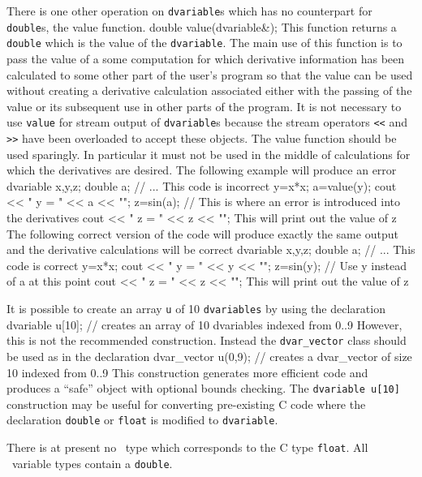 \documentclass[12pt]{book}
\begin{document}
There is one other operation on {\tt dvariable}s which has no counterpart
for {\tt double}s, the  value function. 
\beginexamplea
double value(dvariable&);
\endexample
\noindent This function returns a {\tt double} which is the value of 
the {\tt dvariable}. The main use of this function is to pass
the value of a some computation for which derivative information has been
calculated to some other part of the user's program so that the value
can be used without creating a derivative
calculation associated either with the passing of the value or its subsequent
use in other parts of the program.
It is not necessary to use {\tt value} for stream output 
of {\tt dvariable}s because the stream operators {\tt <<} and
{\tt >>} have been overloaded to accept these objects. 
The value function should be used sparingly. In particular it must not 
be used in the middle of calculations for which the derivatives are
desired. The following example will produce an error
\beginexamplea
dvariable x,y,z;
double a;
// ...             This code is incorrect
y=x*x;
a=value(y);
cout << " y = " << a << "\n";
z=sin(a); // This is where an error is introduced into the derivatives
cout << " z = " << z << "\n"; This will print out the value of z
\endexample
The following correct version of the code will produce exactly the same 
output and the derivative calculations will be correct 
\beginexamplea
dvariable x,y,z;
double a;
// ...             This code is correct
y=x*x;
cout << " y = " << y << "\n";
z=sin(y); // Use y instead of a at this point 
cout << " z = " << z << "\n"; This will print out the value of z
\endexample

It is possible to create an array {\tt u} of 10 {\tt dvariables} by 
using the declaration 
\beginexamplea
dvariable u[10]; // creates an array of 10 dvariables indexed from 0..9
\endexample
However, this is not the recommended construction. Instead the 
{\tt dvar\_vector} class should be used as in the declaration 
\beginexamplea
dvar\_vector u(0,9); // creates a dvar_vector of size 10 indexed from 0..9
\endexample
\noindent This construction generates more efficient code and produces
 a ``safe'' object with optional bounds
checking. The {\tt dvariable u[10]} construction may be useful for
converting pre-existing C code where the declaration {\tt double} or
{\tt float} is modified to {\tt dvariable}. 

There is at present no \AD\ type which corresponds to the C type {\tt float}. 
All \AD\ variable types contain a {\tt double}. 
\end{document}
